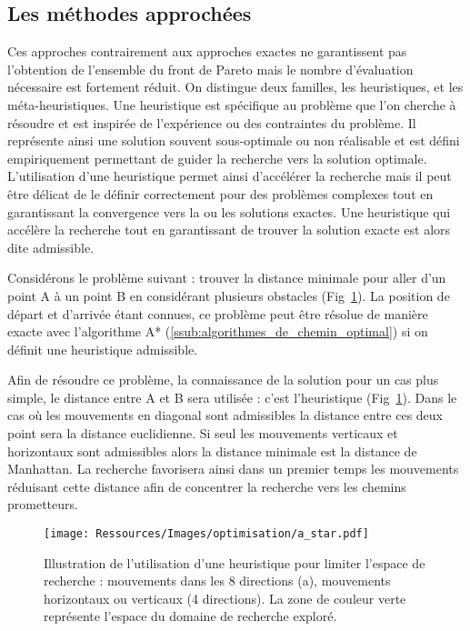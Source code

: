 \subsection{Les méthodes approchées} %
\label{sub:les_methodes_approchees}
Ces approches contrairement aux approches exactes ne garantissent pas l’obtention
de l’ensemble du front de Pareto mais le nombre d’évaluation nécessaire est fortement
réduit. On distingue deux familles, les heuristiques, et les méta-heuristiques.
Une heuristique est spécifique au problème que l’on cherche à résoudre et est
inspirée de l’expérience ou des contraintes du problème. Il représente ainsi une
solution souvent sous-optimale ou non réalisable et est défini empiriquement permettant
de guider la recherche vers la solution optimale. L’utilisation d’une heuristique permet
ainsi d’accélérer la recherche mais il peut être délicat de le définir correctement pour
des problèmes complexes tout en garantissant la convergence vers la ou les solutions
exactes. Une heuristique qui accélère la recherche tout en garantissant de trouver
la solution exacte est alors dite admissible.

Considérons le problème suivant : trouver la distance minimale pour aller d’un point
A à un point B en considérant plusieurs obstacles (Fig~\ref{fig:a_star}).
La position de départ et d’arrivée étant connues, ce problème peut être résolue
de manière exacte avec l’algorithme A* (\ref{ssub:algorithmes_de_chemin_optimal})
si on définit une heuristique admissible.

Afin de résoudre ce problème, la connaissance de la solution pour un cas plus simple, le
distance entre A et B sera utilisée : c’est l’heuristique (Fig~\ref{fig:a_star}).
Dans le cas où les mouvements en diagonal sont admissibles la distance entre ces deux
point sera la distance euclidienne. Si seul les mouvements verticaux et horizontaux sont
admissibles alors la distance minimale est la distance de Manhattan. La recherche
favorisera ainsi dans un premier temps les mouvements réduisant cette distance afin de
concentrer la recherche vers les chemins prometteurs.

\begin{figure}
    \begin{center}
        \texttt{[image: Ressources/Images/optimisation/a\_star.pdf]}
    \end{center}
    \caption{Illustration de l’utilisation d’une heuristique pour limiter l’espace
             de recherche : mouvements dans les 8 directions (a), mouvements
             horizontaux ou verticaux (4 directions). La zone de couleur verte
             représente l’espace du domaine de recherche exploré.
             \label{fig:a_star}}
\end{figure}

